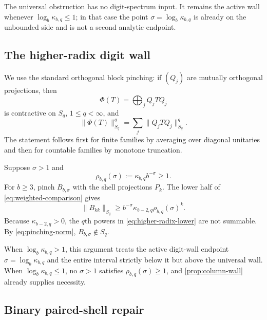 The universal obstruction has no digit-spectrum input.  It remains the
active wall whenever \(\log_b\kappa_{b,q}\le1\); in that case the point
\(\sigma=\log_b\kappa_{b,q}\) is already on the unbounded side and is not a
second analytic endpoint.

\subsection{The higher-radix digit wall}

We use the standard orthogonal block pinching: if \((Q_j)\) are mutually
orthogonal projections, then
\[
  \Phi(T)=\bigoplus_j Q_jTQ_j
\]
is contractive on \(S_q\), \(1\le q<\infty\), and
\begin{equation}
  \|\Phi(T)\|_{S_q}^q
  =\sum_j\|Q_jTQ_j\|_{S_q}^q.
  \label{eq:pinching-norm}
\end{equation}
The statement follows first for finite families by averaging over diagonal
unitaries and then for countable families by monotone truncation.

Suppose \(\sigma>1\) and
\[
  \rho_{b,q}(\sigma):=\kappa_{b,q}b^{-\sigma}\ge1.
\]
For \(b\ge3\), pinch \(B_{b,\sigma}\) with the shell projections \(P_k\).
The lower half of \cref{eq:weighted-comparison} gives
\begin{equation}
  \|B_{kk}\|_{S_q}
  \ge
  b^{-\sigma}\kappa_{b-2,q}
  \rho_{b,q}(\sigma)^k.
  \label{eq:higher-radix-lower}
\end{equation}
Because \(\kappa_{b-2,q}>0\), the \(q\)th powers in
\cref{eq:higher-radix-lower} are not summable.  By
\cref{eq:pinching-norm}, \(B_{b,\sigma}\notin S_q\).

When \(\log_b\kappa_{b,q}>1\), this argument treats the active digit-wall
endpoint \(\sigma=\log_b\kappa_{b,q}\) and the entire interval strictly
below it but above the universal wall.  When
\(\log_b\kappa_{b,q}\le1\), no \(\sigma>1\) satisfies
\(\rho_{b,q}(\sigma)\ge1\), and \cref{prop:column-wall} already supplies
necessity.

\subsection{Binary paired-shell repair}
\label{sec:binary-pairing}

